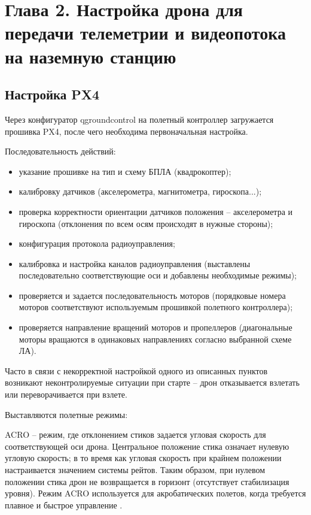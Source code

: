 \section{Глава 2. Настройка дрона для передачи телеметрии и видеопотока на наземную станцию}


\subsection{Настройка PX4}
Через конфигуратор qgroundcontrol на полетный контроллер загружается прошивка PX4, после чего необходима первоначальная настройка.

Последовательность действий:
\begin{itemize}
	\item указание прошивке на тип и схему БПЛА (квадрокоптер);
	\item калибровку датчиков (акселерометра, магнитометра, гироскопа...);
	\item проверка корректности ориентации датчиков положения -- акселерометра и гироскопа (отклонения по всем осям происходят в нужные стороны);
	\item конфигурация протокола радиоуправления;
	\item калибровка и настройка каналов радиоуправления (выставлены последовательно соответствующие оси и добавлены необходимые режимы);
	\item проверяется и задается последовательность моторов (порядковые номера моторов соответствуют используемым прошивкой полетного контроллера);
	\item проверяется направление вращений моторов и пропеллеров (диагональные моторы вращаются в одинаковых направлениях согласно выбранной схеме ЛА).
\end{itemize}

Часто в связи с некорректной настройкой одного из описанных пунктов возникают неконтролируемые ситуации при старте -- дрон отказывается взлетать или переворачивается при взлете.

Выставляются полетные режимы:

ACRO -- режим, где отклонением стиков задается угловая скорость для соответствующей оси дрона. Центральное положение стика означает нулевую угловую скорость; в то время как угловая скорость при крайнем положении настраивается значением системы рейтов. Таким образом, при нулевом положении стика дрон не возвращается в горизонт (отсутствует стабилизация уровня). Режим ACRO используется для акробатических полетов, когда требуется плавное и быстрое управление \cite{ardupilot}.

